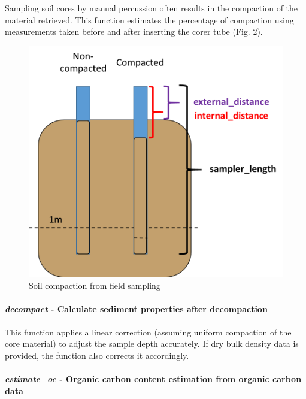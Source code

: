 \documentclass[10pt,a4paper,onecolumn]{article}
\let\oldparagraph\paragraph
\renewcommand{\paragraph}[1]{\oldparagraph{#1}\mbox{}}
\begin{document}
Sampling soil cores by manual percussion often results in the compaction
of the material retrieved. This function estimates the percentage of
compaction using measurements taken before and after inserting the corer
tube (Fig. 2).

\begin{figure}
\centering
\includegraphics[width=4.55208in,height=\textheight,keepaspectratio]{images/compaction-02.png}
\caption{Soil compaction from field sampling}
\end{figure}

\paragraph{\texorpdfstring{\textbf{\emph{decompact}} \textbf{- Calculate
sediment properties after
decompaction}}{decompact - Calculate sediment properties after decompaction}}\label{decompact---calculate-sediment-properties-after-decompaction}

This function applies a linear correction (assuming uniform compaction
of the core material) to adjust the sample depth accurately. If dry bulk
density data is provided, the function also corrects it accordingly.

\paragraph{\texorpdfstring{\textbf{\emph{estimate\_oc}} \textbf{-
Organic carbon content estimation from organic carbon
data}}{estimate\_oc - Organic carbon content estimation from organic carbon data}}\label{estimate_oc---organic-carbon-content-estimation-from-organic-carbon-data}
\end{document}
